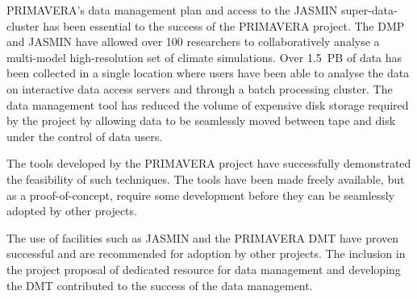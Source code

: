 \documentclass[gmd, manuscript]{copernicus}
\begin{document}
\conclusions  %

PRIMAVERA's data management plan and access to the JASMIN super-data-cluster has been essential to the success of the PRIMAVERA project. The DMP and JASMIN have allowed over 100 researchers to collaboratively analyse a multi-model high-resolution set of climate simulations. Over 1.5~PB of data has been collected in a single location where users have been able to analyse the data on interactive data access servers and through a batch processing cluster. The data management tool has reduced the volume of expensive disk storage required by the project by allowing data to be seamlessly moved between tape and disk under the control of data users.

The tools developed by the PRIMAVERA project have successfully demonstrated the feasibility of such techniques. The tools have been made freely available, but as a proof-of-concept, require some development before they can be seamlessly adopted by other projects.

The use of facilities such as JASMIN and the PRIMAVERA DMT have proven successful and are recommended for adoption by other projects. The inclusion in the project proposal of dedicated resource for data management and developing the DMT contributed to the success of the data management.










\end{document}
